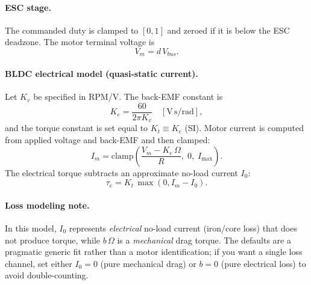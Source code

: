 \paragraph{ESC stage.}
The commanded duty is clamped to $[0,1]$ and zeroed if it is below the ESC deadzone. The motor terminal voltage is
\begin{equation}
  V_m = d\,V_{bus}.
\end{equation}

\paragraph{BLDC electrical model (quasi-static current).}
Let $K_v$ be specified in RPM/V. The back-EMF constant is
\begin{equation}
  K_e = \frac{60}{2\pi K_v} \quad \left[\mathrm{V}\,\mathrm{s}/\mathrm{rad}\right],
\end{equation}
and the torque constant is set equal to $K_t\equiv K_e$ (SI). Motor current is computed from applied voltage and back-EMF and then clamped:
\begin{equation}
  I_m = \mathrm{clamp}\!\left(\frac{V_m - K_e\,\Omega}{R},\; 0,\; I_{\max}\right).
\end{equation}
The electrical torque subtracts an approximate no-load current $I_0$:
\begin{equation}
  \tau_e = K_t\,\max(0, I_m - I_0).
\end{equation}

\paragraph{Loss modeling note.}
In this model, $I_0$ represents \emph{electrical} no-load current (iron/core loss) that does not produce torque, while $b\,\Omega$ is a \emph{mechanical} drag torque. The defaults are a pragmatic generic fit rather than a motor identification; if you want a single loss channel, set either $I_0=0$ (pure mechanical drag) or $b=0$ (pure electrical loss) to avoid double-counting.

